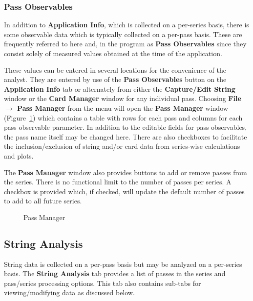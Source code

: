 \documentclass[10pt,letterpaper,titlepage]{article}
\begin{document}
    \subsubsection{Pass Observables}
    In addition to \textbf{Application Info}, which is collected on a per-series basis, there is some observable data which is typically collected on a per-pass basis. These are frequently referred to here and, in the program as \textbf{Pass Observables} since they consist solely of measured values obtained at the time of the application.\par
    These values can be entered in several locations for the convenience of the analyst. They are entered by use of the \textbf{Pass Observables} button on the \textbf{Application Info} tab or alternately from either the \textbf{Capture/Edit String} window or the \textbf{Card Manager} window for any individual pass. Choosing \textbf{File $\rightarrow$ Pass Manager} from the menu will open the \textbf{Pass Manager} window (Figure~\ref{fig:pass_manager}) which contains a table with rows for each pass and columns for each pass observable parameter. In addition to the editable fields for pass observables, the pass name itself may be changed here. There are also checkboxes to facilitate the inclusion/exclusion of string and/or card data from series-wise calculations and plots.\par
    The \textbf{Pass Manager} window also provides buttons to add or remove passes from the series. There is no functional limit to the number of passes per series. A checkbox is provided which, if checked, will update the default number of passes to add to all future series.
    \begin{figure}[hb]
        \centering
        \caption{Pass Manager}
        \label{fig:pass_manager}
    \end{figure}
    \newpage

    \subsection{String Analysis}
    String data is collected on a per-pass basis but may be analyzed on a per-series basis. The \textbf{String Analysis} tab provides a list of passes in the series and pass/series processing options. This tab also contains sub-tabs for viewing/modifying data as discussed below.
    
\end{document}
